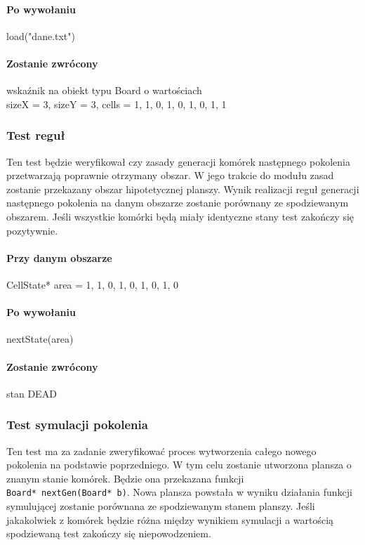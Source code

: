 \documentclass{article}
\begin{document}
\paragraph{Po wywołaniu} load("dane.txt")
\paragraph{Zostanie zwrócony} wskaźnik na obiekt typu Board o wartościach \\ sizeX = 3, sizeY = 3, cells = {1, 1, 0, 1, 0, 1, 0, 1, 1 }

\subsubsection{Test reguł} 
Ten test będzie weryfikował czy zasady generacji komórek następnego pokolenia przetwarzają poprawnie otrzymany obszar. W jego trakcie do modułu zasad zostanie przekazany obszar hipotetycznej planszy. Wynik realizacji reguł generacji następnego pokolenia na danym obszarze zostanie porównany ze spodziewanym obszarem. Jeśli wszystkie komórki będą miały identyczne stany test zakończy się pozytywnie.

\paragraph{Przy danym obszarze} CellState* area = {1, 1, 0, 1, 0, 1, 0, 1, 0}
\paragraph{Po wywołaniu} nextState(area)
\paragraph{Zostanie zwrócony} stan DEAD

\subsubsection{Test symulacji pokolenia} 
Ten test ma za zadanie zweryfikować proces wytworzenia całego nowego pokolenia na podstawie poprzedniego. W tym celu zostanie utworzona plansza o znanym stanie komórek. Będzie ona przekazana funkcji \\ \texttt{Board* nextGen(Board* b)}. Nowa plansza powstała w wyniku działania funkcji symulującej zostanie porównana ze spodziewanym stanem planszy. Jeśli jakakolwiek z komórek będzie różna między wynikiem symulacji a wartością spodziewaną test zakończy się niepowodzeniem.
\end{document}
